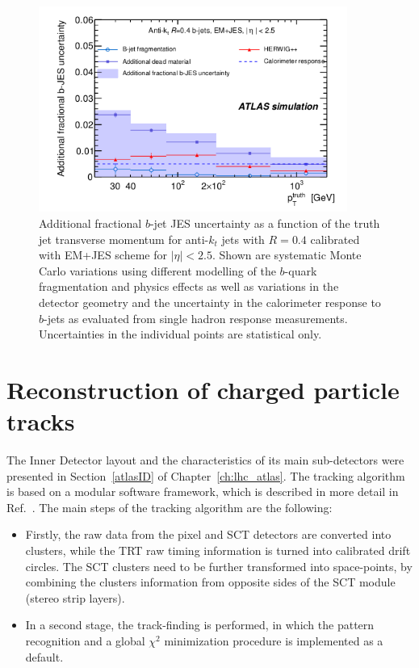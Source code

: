 \begin{figure}[htbp]
  \begin{center}
      \includegraphics[width=0.9\textwidth]{bjetsJESUncertainty.png}
    \caption{Additional fractional $b$-jet JES uncertainty as a function of the truth jet transverse momentum for anti-$k_t$ jets with $R=0.4$ calibrated with EM+JES scheme for $|\eta| < 2.5$. Shown are systematic Monte Carlo variations using different modelling of the $b$-quark fragmentation and physics effects as well as variations in the detector geometry and the uncertainty in the calorimeter response to $b$-jets as evaluated from single hadron response measurements.  Uncertainties in the individual points are statistical only. }
    \label{fig:bjetJESuncertainty}
  \end{center}
\end{figure}


\section{Reconstruction of charged particle tracks}\label{sec:trackreco}

The Inner Detector layout and the characteristics of its main sub-detectors were presented in Section~\ref{atlasID} of Chapter~\ref{ch:lhc_atlas}. The tracking algorithm is based on a modular software framework, which is described in more detail in Ref.~\cite{Cornelissen:1020106}. The main steps of the tracking algorithm are the following:

\begin{itemize}
\item
Firstly, the raw data from the pixel and SCT detectors are converted into clusters, while the TRT raw timing information is turned into calibrated drift circles. The SCT clusters need to be further transformed into space-points, by combining the clusters information from opposite sides of the SCT module (stereo strip layers).
\item
In a second stage, the track-finding is performed, in which the pattern recognition and a global $\chi^2$ minimization procedure is implemented as a default.
\end{itemize}

